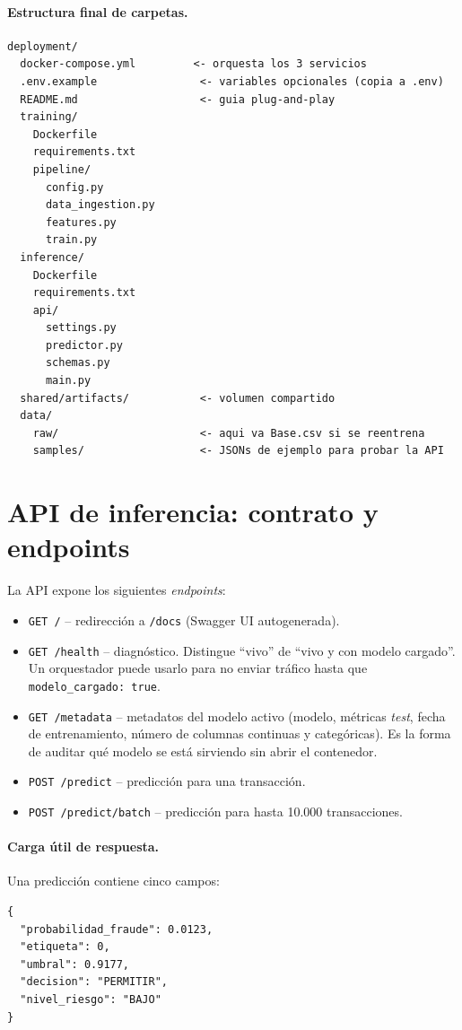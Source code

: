 \documentclass[12pt,a4paper]{report}
\begin{document}
\paragraph{Estructura final de carpetas.}
\begin{verbatim}
deployment/
  docker-compose.yml         <- orquesta los 3 servicios
  .env.example                <- variables opcionales (copia a .env)
  README.md                   <- guia plug-and-play
  training/
    Dockerfile
    requirements.txt
    pipeline/
      config.py
      data_ingestion.py
      features.py
      train.py
  inference/
    Dockerfile
    requirements.txt
    api/
      settings.py
      predictor.py
      schemas.py
      main.py
  shared/artifacts/           <- volumen compartido
  data/
    raw/                      <- aqui va Base.csv si se reentrena
    samples/                  <- JSONs de ejemplo para probar la API
\end{verbatim}

\section{API de inferencia: contrato y endpoints}
\label{sec:hito4-api}

La API expone los siguientes \textit{endpoints}:

\begin{itemize}
    \item \texttt{GET /} -- redirección a \texttt{/docs} (Swagger UI autogenerada).
    \item \texttt{GET /health} -- diagnóstico. Distingue ``vivo'' de ``vivo y con modelo cargado''. Un orquestador puede usarlo para no enviar tráfico hasta que \texttt{modelo\_cargado: true}.
    \item \texttt{GET /metadata} -- metadatos del modelo activo (modelo, métricas \textit{test}, fecha de entrenamiento, número de columnas continuas y categóricas). Es la forma de auditar qué modelo se está sirviendo sin abrir el contenedor.
    \item \texttt{POST /predict} -- predicción para una transacción.
    \item \texttt{POST /predict/batch} -- predicción para hasta 10.000 transacciones.
\end{itemize}

\paragraph{Carga útil de respuesta.} Una predicción contiene cinco campos:
\begin{verbatim}
{
  "probabilidad_fraude": 0.0123,
  "etiqueta": 0,
  "umbral": 0.9177,
  "decision": "PERMITIR",
  "nivel_riesgo": "BAJO"
}
\end{verbatim}
\end{document}
